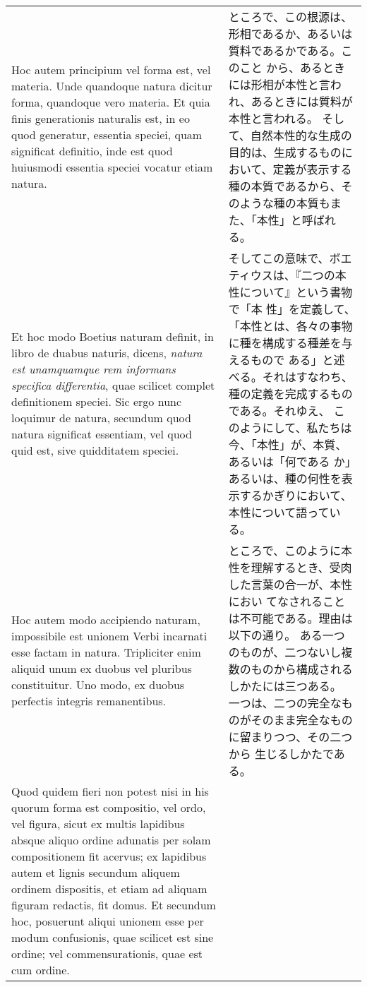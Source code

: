 \documentclass[10pt]{jsarticle} %
\begin{document}
\begin{longtable}{p{21em}p{21em}}
\\


Hoc autem principium vel forma est, vel materia. Unde
quandoque natura dicitur forma, quandoque vero materia. Et quia finis
generationis naturalis est, in eo quod generatur, essentia speciei, quam
significat definitio, inde est quod huiusmodi essentia speciei vocatur
etiam natura. 


&

ところで、この根源は、形相であるか、あるいは質料であるかである。このこと
 から、あるときには形相が本性と言われ、あるときには質料が本性と言われる。
 そして、自然本性的な生成の目的は、生成するものにおいて、定義が表示する
 種の本質であるから、そのような種の本質もまた、「本性」と呼ばれる。


\\


Et hoc modo Boetius naturam definit, in libro de duabus
naturis, dicens, {\itshape natura est unamquamque rem informans specifica
differentia}, quae scilicet complet definitionem speciei. Sic ergo nunc
loquimur de natura, secundum quod natura significat essentiam, vel quod
quid est, sive quidditatem speciei. 



&

そしてこの意味で、ボエティウスは、『二つの本性について』という書物で「本
 性」を定義して、「本性とは、各々の事物に種を構成する種差を与えるもので
 ある」と述べる。それはすなわち、種の定義を完成するものである。それゆえ、
 このようにして、私たちは今、「本性」が、本質、あるいは「何である
 か」あるいは、種の何性を表示するかぎりにおいて、本性について語っている。


\\


Hoc autem modo accipiendo naturam,
impossibile est unionem Verbi incarnati esse factam in
natura. Tripliciter enim aliquid unum ex duobus vel pluribus
constituitur. Uno modo, ex duobus perfectis integris remanentibus. 



&

ところで、このように本性を理解するとき、受肉した言葉の合一が、本性におい
 てなされることは不可能である。理由は以下の通り。
ある一つのものが、二つないし複数のものから構成されるしかたには三つある。
一つは、二つの完全なものがそのまま完全なものに留まりつつ、その二つから
 生じるしかたである。


\\

Quod
quidem fieri non potest nisi in his quorum forma est compositio, vel
ordo, vel figura, sicut ex multis lapidibus absque aliquo ordine
adunatis per solam compositionem fit acervus; ex lapidibus autem et
lignis secundum aliquem ordinem dispositis, et etiam ad aliquam figuram
redactis, fit domus. 
Et secundum hoc, posuerunt aliqui unionem esse per
modum confusionis, quae scilicet est sine ordine; vel commensurationis,
quae est cum ordine. 


\end{longtable}
\end{document}
